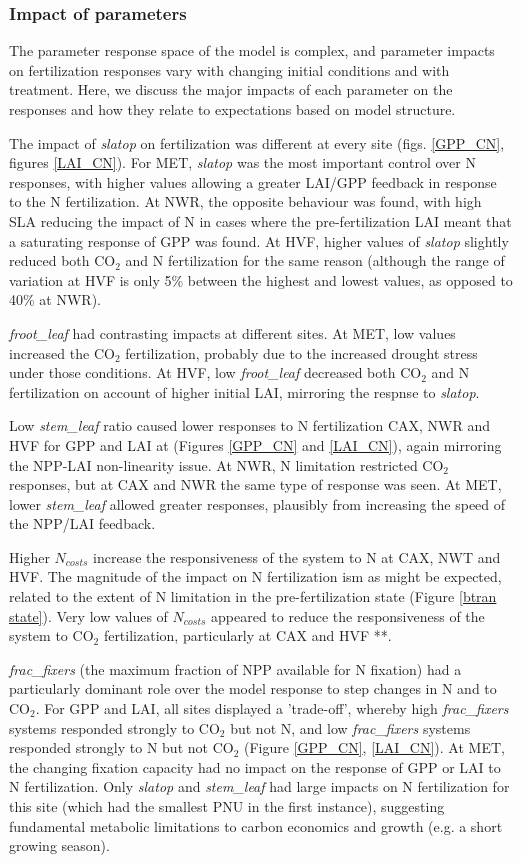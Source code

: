 \documentclass[draft,linenumbers]{agujournal}
\begin{document}
\subsubsection{Impact of parameters}
The parameter response space of the model is complex, and parameter impacts on fertilization responses vary with changing initial conditions and with treatment. Here, we discuss the major impacts of each parameter on the responses and how they relate to expectations based on model structure. 

The impact of \emph{slatop} on fertilization was different at every site (figs. \ref{GPP_CN}, figures \ref{LAI_CN}). For MET, \emph{slatop} was the most important control over N responses, with higher values allowing a greater LAI/GPP feedback in response to the N fertilization. At NWR, the opposite behaviour was found, with high SLA reducing the impact of N in cases where the pre-fertilization LAI meant that a saturating response of GPP was found. At HVF, higher values of \emph{slatop} slightly reduced both CO$_{2}$ and N fertilization for the same reason (although the range of variation at HVF is only 5\% between the highest and lowest values, as opposed to 40\% at NWR).

\emph{froot\_leaf} had contrasting impacts at different sites.  At MET,  low values increased the CO$_{2}$ fertilization, probably due to the increased drought stress under those conditions. At HVF, low \emph{froot\_leaf} decreased both CO$_{2}$ and N fertilization on account of higher initial LAI, mirroring the respnse to \emph{slatop}. 

Low \emph{stem\_leaf} ratio caused lower responses to N fertilization CAX, NWR and HVF for GPP and LAI at  (Figures \ref{GPP_CN} and \ref{LAI_CN}), again mirroring the NPP-LAI non-linearity issue.  At NWR,  N limitation restricted CO$_{2}$ responses, but at CAX and NWR the same type of response was seen.  At MET, lower \emph{stem\_leaf} allowed greater responses, plausibly from increasing the speed of the NPP/LAI feedback.  

Higher $N_{costs}$ increase the responsiveness of the system to N at CAX, NWT and HVF.  The magnitude of the impact on N fertilization ism as might be expected, related to the extent of N limitation in the pre-fertilization state (Figure \ref{btran state}).   Very low values of $N_{costs}$ appeared to reduce the responsiveness of the system to CO$_{2}$ fertilization, particularly at CAX and HVF **. 

\emph{frac\_fixers} (the maximum fraction of NPP available for N fixation) had a particularly dominant role over the model response to step changes in N and to CO$_{2}$. For GPP and LAI, all sites displayed a 'trade-off', whereby high \emph{frac\_fixers} systems responded strongly to CO$_{2}$ but not N, and low \emph{frac\_fixers} systems responded strongly to N but not CO$_{2}$ (Figure \ref{GPP_CN}, \ref{LAI_CN}).   At MET,  the changing fixation capacity had no impact on the response of GPP or LAI to N fertilization.  Only \emph{slatop} and \emph{stem\_leaf} had large impacts on N fertilization for this site (which had the smallest PNU in the first instance), suggesting fundamental metabolic limitations to carbon economics and growth (e.g. a short growing season). 
\end{document}

